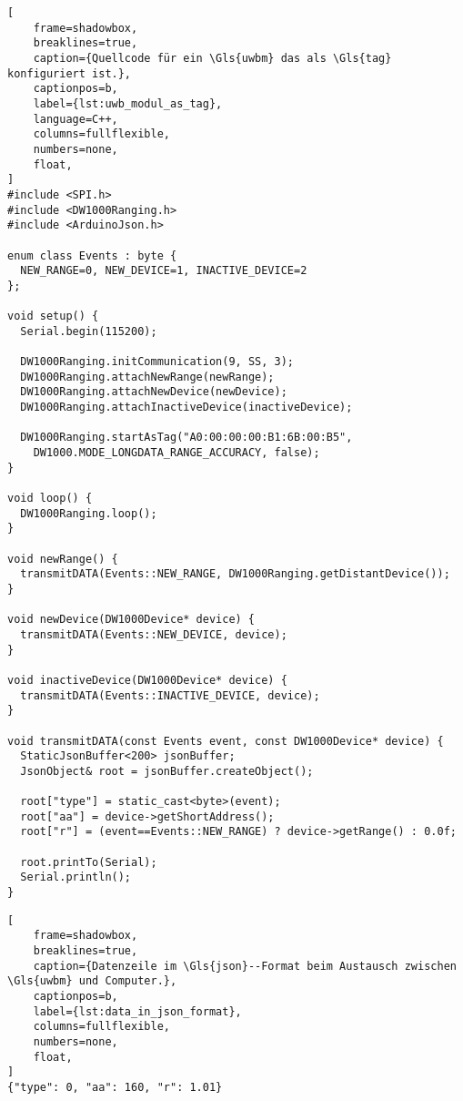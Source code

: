 \begin{lstlisting}[
	frame=shadowbox,
	breaklines=true,
	caption={Quellcode für ein \Gls{uwbm} das als \Gls{tag} konfiguriert ist.},
	captionpos=b,
	label={lst:uwb_modul_as_tag},
	language=C++,
	columns=fullflexible,
	numbers=none,
	float,
]
#include <SPI.h>
#include <DW1000Ranging.h>
#include <ArduinoJson.h>

enum class Events : byte {
  NEW_RANGE=0, NEW_DEVICE=1, INACTIVE_DEVICE=2
};

void setup() {
  Serial.begin(115200);
  
  DW1000Ranging.initCommunication(9, SS, 3);
  DW1000Ranging.attachNewRange(newRange);
  DW1000Ranging.attachNewDevice(newDevice);
  DW1000Ranging.attachInactiveDevice(inactiveDevice);

  DW1000Ranging.startAsTag("A0:00:00:00:B1:6B:00:B5",
    DW1000.MODE_LONGDATA_RANGE_ACCURACY, false);
}

void loop() {
  DW1000Ranging.loop();
}

void newRange() {
  transmitDATA(Events::NEW_RANGE, DW1000Ranging.getDistantDevice());
}

void newDevice(DW1000Device* device) {
  transmitDATA(Events::NEW_DEVICE, device);
}

void inactiveDevice(DW1000Device* device) {
  transmitDATA(Events::INACTIVE_DEVICE, device);
}

void transmitDATA(const Events event, const DW1000Device* device) {
  StaticJsonBuffer<200> jsonBuffer;
  JsonObject& root = jsonBuffer.createObject();

  root["type"] = static_cast<byte>(event);
  root["aa"] = device->getShortAddress();
  root["r"] = (event==Events::NEW_RANGE) ? device->getRange() : 0.0f;
  
  root.printTo(Serial);
  Serial.println();
}
\end{lstlisting}

\begin{lstlisting}[
	frame=shadowbox,
	breaklines=true,
	caption={Datenzeile im \Gls{json}--Format beim Austausch zwischen \Gls{uwbm} und Computer.},
	captionpos=b,
	label={lst:data_in_json_format},
	columns=fullflexible,
	numbers=none,
	float,
]
{"type": 0, "aa": 160, "r": 1.01}
\end{lstlisting}

